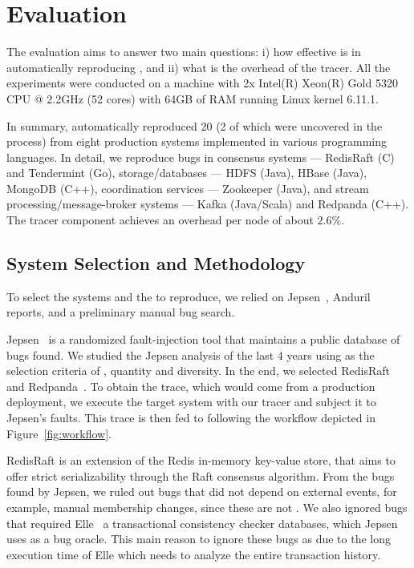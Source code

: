 \section{Evaluation}
\label{sec:evaluation}

The evaluation aims to answer two main questions:
i) how effective is \sys in automatically reproducing \efib, and
ii) what is the overhead of the tracer.
All the experiments were conducted on a machine with 2x Intel(R) Xeon(R) Gold 5320 CPU @ 2.2GHz (52 cores) with 64GB of RAM running Linux kernel 6.11.1.

In summary, \sys automatically reproduced 20 \efibshort (2 of which were uncovered in the process) from eight production systems implemented in various programming languages.
In detail, we reproduce bugs in consensus systems --- RedisRaft (C) and Tendermint (Go), storage/databases --- HDFS (Java), HBase (Java), MongoDB (C++), coordination services --- Zookeeper (Java), and stream processing/message-broker systems --- Kafka (Java/Scala) and Redpanda (C++).
The tracer component achieves an overhead per node of about $2.6\%$.

\subsection{System Selection and Methodology}
To select the systems and the \efib to reproduce, we relied on Jepsen~\cite{jepsen}, Anduril~\cite{anduril} reports, and a preliminary manual bug search.

Jepsen~\cite{jepsen} is a randomized fault-injection tool that maintains a public database of bugs found.
We studied the Jepsen analysis of the last 4 years using as the selection criteria of \efibshort, quantity and diversity.
In the end, we selected RedisRaft~\cite{redisraft,redisraftreport} and Redpanda~\cite{redpanda,redpandareport}.
To obtain the trace, which would come from a production deployment, we execute the target system with our tracer and subject it to Jepsen's faults.
This trace is then fed to \sys following the workflow depicted in Figure~\ref{fig:workflow}.


RedisRaft is an extension of the Redis in-memory key-value store, that aims to offer strict serializability through the Raft consensus algorithm.
From the bugs found by Jepsen, we ruled out bugs that did not depend on external events, for example, manual membership changes, since these are not \efibshort.
We also ignored bugs that required Elle~\cite{elle} a transactional consistency checker databases, which Jepsen uses as a bug oracle.
This main reason to ignore these bugs as due to the long execution time of Elle which needs to analyze the entire transaction history.

